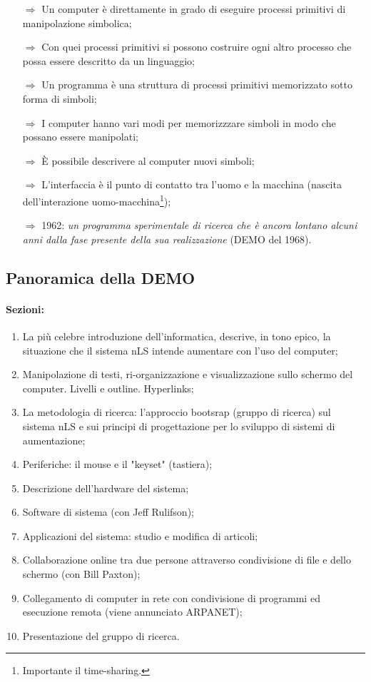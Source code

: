\begin{itemize}
    \item [$\Rightarrow$] Un computer è direttamente in grado di eseguire processi primitivi di manipolazione simbolica;
    \item [$\Rightarrow$] Con quei processi primitivi si possono costruire ogni altro processo che possa essere descritto da un linguaggio;
    \item [$\Rightarrow$] Un programma è una struttura di processi primitivi memorizzato sotto forma di simboli;
    \item [$\Rightarrow$] I computer hanno vari modi per memorizzzare simboli in modo che possano essere manipolati;
    \item [$\Rightarrow$] È possibile descrivere al computer nuovi simboli;
    \item [$\Rightarrow$] L'interfaccia è il punto di contatto tra l'uomo e la macchina (nascita dell'interazione uomo-macchina\footnote{Importante il time-sharing.});
    \item [$\Rightarrow$] 1962: \textit{un programma sperimentale di ricerca che è ancora lontano alcuni anni dalla fase presente della sua realizzazione} (DEMO del 1968).
\end{itemize}

\subsection{Panoramica della DEMO}

\paragraph{Sezioni:}

\begin{enumerate}
    \item La più celebre introduzione dell'informatica, descrive, in tono epico,
    la situazione che il sistema nLS intende aumentare con l'uso del computer;
    \item Manipolazione di testi, ri-organizzazione e visualizzazione sullo schermo del 
    computer. Livelli e outline. Hyperlinks;
    \item La metodologia di ricerca: l'approccio bootsrap (gruppo di ricerca) sul sistema nLS
    e sui principi di progettazione per lo sviluppo di sistemi di aumentazione;
    \item Periferiche: il mouse e il "keyset" (tastiera);
    \item Descrizione dell'hardware del sistema;
    \item Software di sistema (con Jeff Rulifson);
    \item Applicazioni del sistema: studio e modifica di articoli;
    \item Collaborazione online tra due persone attraverso condivisione di file e dello schermo (con Bill Paxton);
    \item Collegamento di computer in rete con condivisione di programmi ed esecuzione remota (viene annunciato ARPANET);
    \item Presentazione del gruppo di ricerca.
\end{enumerate}

